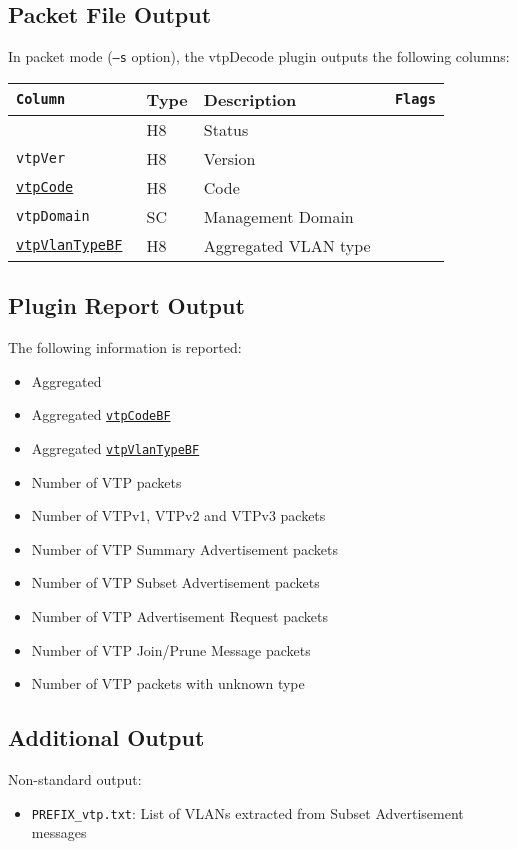 \documentclass[documentation]{subfiles}
\begin{document}
\subsection{Packet File Output}
In packet mode ({\tt --s} option), the vtpDecode plugin outputs the following columns:
\begin{longtable}{>{\tt}lll>{\tt\small}l}
    \toprule
    {\bf Column} & {\bf Type} & {\bf Description} & {\bf Flags}\\
    \midrule\endhead%
    \nameref{vtpStat}                     & H8 & Status               & \\
    vtpVer                                & H8 & Version              & \\
    \hyperref[vtpCode]{vtpCode}           & H8 & Code                 & \\
    vtpDomain                             & SC & Management Domain    & \\
    \hyperref[vtpVlanType]{vtpVlanTypeBF} & H8 & Aggregated VLAN type & \\
    \bottomrule
\end{longtable}

\subsection{Plugin Report Output}
The following information is reported:
\begin{itemize}
    \item Aggregated {\tt{}}
    \item Aggregated {\tt\hyperref[vtpCode]{vtpCodeBF}}
    \item Aggregated {\tt\hyperref[vtpVlanType]{vtpVlanTypeBF}}
    \item Number of VTP packets
    \item Number of VTPv1, VTPv2 and VTPv3 packets
    \item Number of VTP Summary Advertisement packets
    \item Number of VTP Subset Advertisement packets
    \item Number of VTP Advertisement Request packets
    \item Number of VTP Join/Prune Message packets
    \item Number of VTP packets with unknown type
\end{itemize}

\subsection{Additional Output}
Non-standard output:
\begin{itemize}
    \item {\tt PREFIX\_vtp.txt}: List of VLANs extracted from Subset Advertisement messages
\end{itemize}
\end{document}
